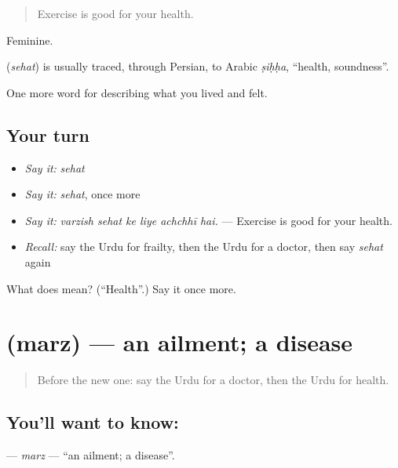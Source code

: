 \begin{quote}
Exercise is good for your health.
\end{quote}

Feminine.

\begin{cousinweb}
\textbf{} (\emph{sehat}) is usually traced, through Persian, to Arabic \emph{ṣiḥḥa}, \textquotedblleft{}health, soundness\textquotedblright{}.
\end{cousinweb}

\begin{grammarlens}[title={What you've built}]
One more word for describing what you lived and felt.
\end{grammarlens}

\subsection*{Your turn}
\begin{itemize}
\raggedright
  \item \emph{Say it:} \emph{sehat}
  \item \emph{Say it:} \emph{sehat}, once more
  \item \emph{Say it:} \emph{varzish sehat ke liye achchhī hai.} — Exercise is good for your health.
  \item \emph{Recall:} say the Urdu for frailty, then the Urdu for a doctor, then say \emph{sehat} again
\end{itemize}

\begin{tcolorbox}[breakable,colback=teal!4,colframe=teal!35!black,title={Before you move on}]
What does  mean? (\textquotedblleft{}Health\textquotedblright{}.) Say it once more.
\end{tcolorbox}
\section[\texorpdfstring{\ur{مرض} (marz)}{مرض (marz)}]{ (marz) — an ailment; a disease}

\label{lesson:UR-C471-marz}



\begin{quote}
Before the new one: say the Urdu for a doctor, then the Urdu for health.
\end{quote}

\subsection*{You'll want to know: }
\textbf{} — \emph{marz} — \textquotedblleft{}an ailment; a disease\textquotedblright{}.

